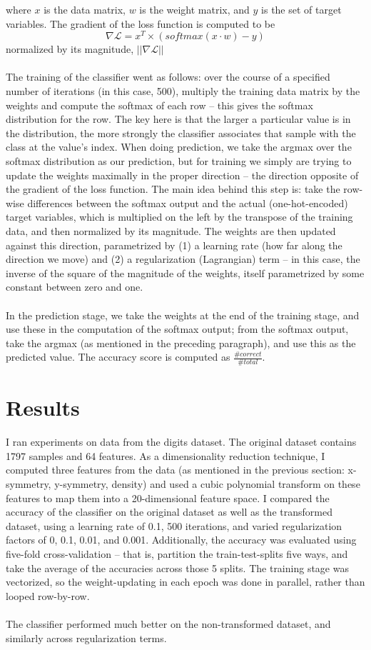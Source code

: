 \documentclass[11pt]{article}
\begin{document}
where $x$ is the data matrix, $w$ is the weight matrix, and $y$ is the set of target variables. The gradient of the loss function is computed to be 
$$ \nabla\mathcal{L} = x^T \times (softmax(x\cdot w) - y) $$ 
normalized by its magnitude, $|| \nabla\mathcal{L}||$\\
 \\
The training of the classifier went as follows: over the course of a specified number of iterations  (in this case, 500), multiply the training data matrix by the weights and compute the softmax of each row – this gives the softmax distribution for the row. The key here is that the larger a particular value is in the distribution, the more strongly the classifier associates that sample with the class at the value's index. When doing prediction, we take the argmax over the softmax distribution as our prediction, but for training we simply are trying to update the weights maximally in the proper direction – the direction opposite of the gradient of the loss function. The main idea behind this step is: take the row-wise differences between the softmax output and the actual (one-hot-encoded) target variables, which is multiplied on the left by the transpose of the training data, and then normalized by its magnitude. The weights are then updated against this direction, parametrized by (1) a learning rate (how far along the direction we move) and (2) a regularization (Lagrangian) term – in this case, the inverse of the square of the magnitude of the weights, itself parametrized by some constant between zero and one.\\
  \\
In the prediction stage, we take the weights at the end of the training stage, and use these in the computation of the softmax output; from the softmax output, take the argmax (as mentioned in the preceding paragraph), and use this as the predicted value. The accuracy score is computed as $\frac{\# correct}{\# total}$.

\section{Results}
I ran experiments on data from the digits dataset. The original dataset contains 1797 samples and 64 features. As a dimensionality reduction technique, I computed three features from the data (as mentioned in the previous section: x-symmetry, y-symmetry, density) and used a cubic polynomial transform on these features to map them into a 20-dimensional feature space. I compared the accuracy of the classifier on the original dataset as well as the transformed dataset, using a learning rate of 0.1, 500 iterations, and varied regularization factors of 0, 0.1, 0.01, and 0.001. Additionally, the accuracy was evaluated using five-fold cross-validation – that is, partition the train-test-splits five ways, and take the average of the accuracies across those 5 splits. The training stage was vectorized, so the weight-updating in each epoch was done in parallel, rather than looped row-by-row.\\
 \\
 The classifier performed much better on the non-transformed dataset, and similarly across regularization terms. 
 
\end{document}

